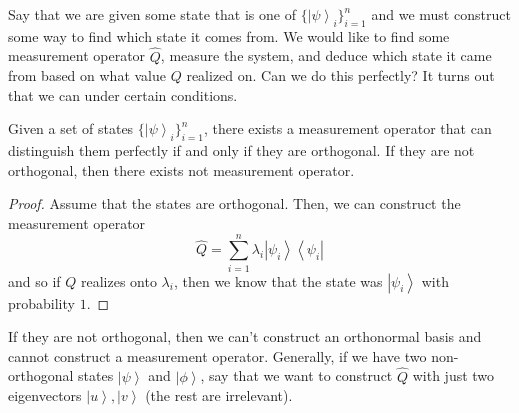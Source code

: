 \documentclass{article}
\newcommand{\ket}[1]{\ensuremath{\left|#1\right\rangle}}
\newcommand{\bra}[1]{\ensuremath{\left\langle#1\right|}}
\begin{document}
    Say that we are given some state that is one of $\{\ket{\psi}_i\}_{i=1}^n$ and we must construct some way to find which state it comes from. We would like to find some measurement operator $\hat{Q}$, measure the system, and deduce which state it came from based on what value $Q$ realized on. Can we do this perfectly? It turns out that we can under certain conditions. 

    \begin{theorem}
      Given a set of states $\{\ket{\psi}_i\}_{i=1}^n$, there exists a measurement operator that can distinguish them perfectly if and only if they are orthogonal. If they are not orthogonal, then there exists not measurement operator. 
    \end{theorem}
    \begin{proof} 
      Assume that the states are orthogonal. Then, we can construct the measurement operator 
      \begin{equation} 
        \hat{Q} = \sum_{i=1}^n \lambda_i \ket{\psi_i}\bra{\psi_i}
      \end{equation}
      and so if $Q$ realizes onto $\lambda_i$, then we know that the state was $\ket{\psi_i}$ with probability $1$. 
    \end{proof}
    If they are not orthogonal, then we can't construct an orthonormal basis and cannot construct a measurement operator. Generally, if we have two non-orthogonal states $\ket{\psi}$ and $\ket{\phi}$, say that we want to construct $\hat{Q}$ with just two eigenvectors $\ket{u}, \ket{v}$ (the rest are irrelevant). 
\end{document}
